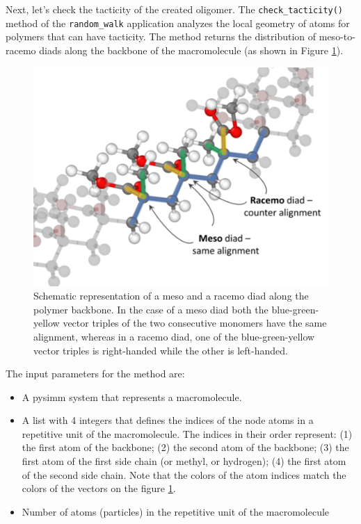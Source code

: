 \documentclass[9pt,tutorial]{livecoms}
\begin{document}
Next, let's check the tacticity of the created oligomer. The \lstinline$check_tacticity()$ method of the \lstinline$random_walk$ application analyzes the local geometry of atoms for polymers that can have tacticity. The method returns the distribution of meso-to-racemo diads along the backbone of the macromolecule (as shown in Figure \ref{diads:scheme}).

\begin{figure}[htbp]
  \centering
    \includegraphics[width=0.85\columnwidth]{figures/figure3}
    \caption{Schematic representation of a meso and a racemo diad along the polymer backbone. In the case of a meso diad both the blue-green-yellow vector triples of the two consecutive monomers have the same alignment, whereas in a racemo diad, one of the blue-green-yellow vector triples is right-handed while the other is left-handed.}
    \label{diads:scheme}
\end{figure}

The input parameters for the method are:
\begin{itemize}
 \item A pysimm system that represents a macromolecule.
 \item A list with 4 integers that defines the indices of the node atoms in a repetitive unit of the macromolecule. The indices in their order represent: (1) the first atom of the backbone; (2) the second atom of the backbone; (3) the first atom of the first side chain (or methyl, or hydrogen); (4) the first atom of the second side chain. Note that the colors of the atom indices match the colors of the vectors on the figure \ref{diads:scheme}. 
 \item Number of atoms (particles) in the repetitive unit of the macromolecule
\end{itemize}
\end{document}
